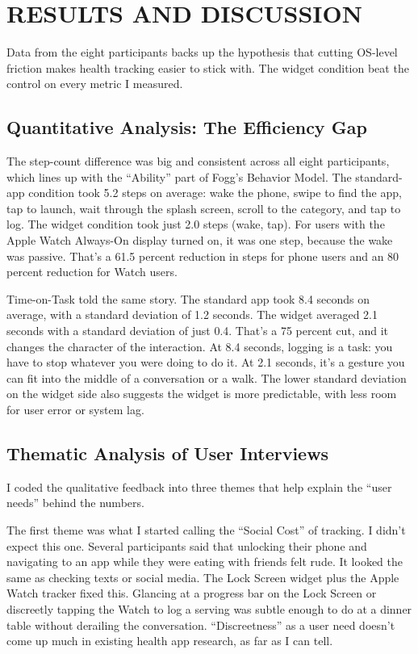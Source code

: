 \documentclass[10pt,twocolumn]{article}
\begin{document}
\section{RESULTS AND DISCUSSION}

Data from the eight participants backs up the hypothesis that cutting OS-level friction makes health tracking easier to stick with. The widget condition beat the control on every metric I measured.

\subsection{Quantitative Analysis: The Efficiency Gap}

The step-count difference was big and consistent across all eight participants, which lines up with the ``Ability'' part of Fogg's Behavior Model.\cite{FoggBehaviorModel} The standard-app condition took 5.2 steps on average: wake the phone, swipe to find the app, tap to launch, wait through the splash screen, scroll to the category, and tap to log. The widget condition took just 2.0 steps (wake, tap). For users with the Apple Watch Always-On display turned on, it was one step, because the wake was passive. That's a 61.5 percent reduction in steps for phone users and an 80 percent reduction for Watch users.

Time-on-Task told the same story. The standard app took 8.4 seconds on average, with a standard deviation of 1.2 seconds. The widget averaged 2.1 seconds with a standard deviation of just 0.4. That's a 75 percent cut, and it changes the character of the interaction. At 8.4 seconds, logging is a task: you have to stop whatever you were doing to do it. At 2.1 seconds, it's a gesture you can fit into the middle of a conversation or a walk. The lower standard deviation on the widget side also suggests the widget is more predictable, with less room for user error or system lag.

\subsection{Thematic Analysis of User Interviews}

I coded the qualitative feedback into three themes that help explain the ``user needs'' behind the numbers.

The first theme was what I started calling the ``Social Cost'' of tracking. I didn't expect this one. Several participants said that unlocking their phone and navigating to an app while they were eating with friends felt rude. It looked the same as checking texts or social media. The Lock Screen widget plus the Apple Watch tracker fixed this. Glancing at a progress bar on the Lock Screen or discreetly tapping the Watch to log a serving was subtle enough to do at a dinner table without derailing the conversation. ``Discreetness'' as a user need doesn't come up much in existing health app research, as far as I can tell.
\end{document}
